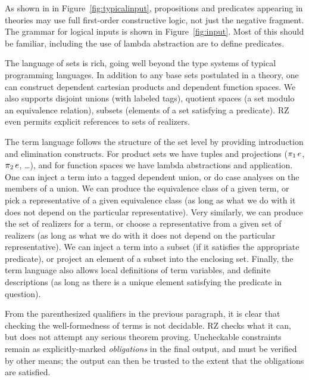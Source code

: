As shown in in Figure~\ref{fig:typicalinput}, propositions and predicates
appearing in theories may use full first-order constructive logic, not just the
negative fragment. The grammar for logical inputs is shown in
Figure~\ref{fig:input}. Most of this should be familiar, including the use of
lambda abstraction are to define predicates.

The language of sets is rich, going well beyond the type systems of typical
programming languages. In addition to any base sets postulated in a theory, one
can construct dependent cartesian products and dependent function spaces. We
also supports disjoint unions (with labeled tags), quotient spaces (a set
modulo an equivalence relation), subsets (elements of a set satisfying a
predicate). RZ even permits explicit references to sets of realizers.

The term language follows the structure of the set level by providing
introduction and elimination constructs. For product sets we have tuples and
projections ($\mathop{\pi_{1}} e$, $\mathop{\pi_{2}} e$, \ldots), and for function spaces we have lambda abstractions and
application. One can inject a term into a tagged dependent union, or do case analyses
on the members of a union. We can produce the equivalence class of a given
term, or pick a representative of a given equivalence class (as long as what we
do with it does not depend on the particular representative). Very similarly,
we can produce the set of realizers for a term, or choose a representative from
a given set of realizers (as long as what we do with it does not depend on the
particular representative). We can inject a term into a subset (if it satisfies
the appropriate predicate), or project an element of a subset into the
enclosing set. Finally, the term language also allows local definitions of term
variables, and definite descriptions (as long as there is a unique element
satisfying the predicate in question).

From the parenthesized qualifiers in the previous paragraph, it is clear that checking the
well-formedness of terms is not decidable. RZ checks what it can, but does not
attempt any serious theorem proving.  Uncheckable constraints remain as
explicitly-marked \emph{obligations} in the final output, and must be verified
by other means; the output can then be trusted to the extent that the obligations are satisfied.



